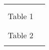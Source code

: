 \documentclass[crop]{standalone}
\begin{document}
    \begin{tabular}{|c|c|}
        \hline
        \rowcolor{red} \multicolumn{2}{|c|}{Formal} \\
        \hline
        \multirow{8}{*}{Table 1} & \\
                                 & \\
                                 & \\
                                 & \\
                                 & \\
                                 & \\
                                 & \\
                                 & \\
        \hline
        \multirow{5}{*}{Table 2} & \\
                                 & \\
                                 & \\
                                 & \\
                                 & \\
                                 & \\
        \hline
    \end{tabular}
\end{document}
